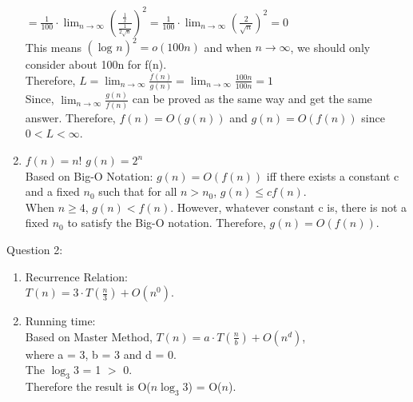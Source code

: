 \documentclass[12pt]{article}
\begin{document}
\begin{enumerate}[label=(\alph*)]
    $=\frac{1}{100} \cdot \lim_{n\to\infty}(\frac{\frac{1}{x}}{\frac{1}{2\sqrt{n}}})^2 = \frac{1}{100} \cdot \lim_{n\to\infty}(\frac{2}{\sqrt{n}})^2 = 0$ \vspace{1mm} \\
    This means $(\log_{}{n})^2 = o(100n)$ and when $n\rightarrow\infty$, we should only consider about 100n for f(n). \vspace{1mm} \\
    Therefore, $L = \lim_{n\to\infty} \frac{f(n)}{g(n)} = \lim_{n\to\infty} \frac{100n}{100n} = 1  $\vspace{2mm} \vspace{1mm} \\
    Since, $\lim_{n\to\infty} \frac{g(n)}{f(n)}$ can be proved as the same way and get the same answer. Therefore, $f(n) = O(g(n)) $ and $g(n) = O(f(n)) $ since $0 < L < \infty$.
  \item $f(n) = n!$ \hspace{1cm} $g(n) = 2^n$ \vspace{1mm} \\
    Based on Big-O Notation: $g(n) = O(f(n))$ iff there exists a constant c and a fixed $n_0$ such that for all $n > n_0$, $g(n) \leq cf(n)$. \vspace{1mm} \\
    When $n \geq 4$, $g(n) < f(n)$. However, whatever constant c is, there is not a fixed $n_0$ to satisfy the Big-O notation. Therefore, $g(n) = O(f(n))$.
\end{enumerate}


\pagebreak
\large Question 2:\\
\normalsize 
\begin{enumerate}
\item Recurrence Relation: \\
$T(n) = 3 \cdot T(\frac{n}{3}) + O(n^0)$.
\item Running time:\\
Based on Master Method, $T(n) = a \cdot T(\frac{n}{b}) + O(n^d)$,\\
where a = 3, b = 3 and d = 0.\\
The ${\log_3 3}$ = 1 $>$ 0. \\
Therefore the result is O($n{\log_3 3}$) = O($n$).
\end{enumerate}
\end{document}
